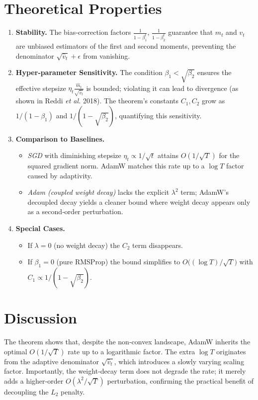 \documentclass{article}
\begin{document}
\section*{Theoretical Properties}
\begin{enumerate}[label=\arabic*.]
\item \textbf{Stability.} The bias‑correction factors $\frac{1}{1-\beta_1^{t}}$, $\frac{1}{1-\beta_2^{t}}$ guarantee that $m_t$ and $v_t$ are unbiased estimators of the first and second moments, preventing the denominator $\sqrt{\hat v_t}+\epsilon$ from vanishing.
\item \textbf{Hyper‑parameter Sensitivity.} The condition $\beta_1<\sqrt{\beta_2}$ ensures the effective stepsize $\eta_t\frac{\hat m_t}{\sqrt{\hat v_t}}$ is bounded; violating it can lead to divergence (as shown in Reddi \emph{et al.} 2018). The theorem’s constants $C_1,C_2$ grow as $1/(1-\beta_1)$ and $1/(1-\sqrt{\beta_2})$, quantifying this sensitivity.
\item \textbf{Comparison to Baselines.}
    \begin{itemize}
        \item \emph{SGD} with diminishing stepsize $\eta_t\propto 1/\sqrt{t}$ attains $O(1/\sqrt{T})$ for the squared gradient norm. AdamW matches this rate up to a $\log T$ factor caused by adaptivity.
        \item \emph{Adam (coupled weight decay)} lacks the explicit $\lambda^2$ term; AdamW’s decoupled decay yields a cleaner bound where weight decay appears only as a second‑order perturbation.
    \end{itemize}
\item \textbf{Special Cases.}
    \begin{itemize}
        \item If $\lambda=0$ (no weight decay) the $C_2$ term disappears.
        \item If $\beta_1=0$ (pure RMSProp) the bound simplifies to $O\bigl((\log T)/\sqrt{T}\bigr)$ with $C_1\propto 1/(1-\sqrt{\beta_2})$.
    \end{itemize}
\end{enumerate}

\section*{Discussion}
The theorem shows that, despite the non‑convex landscape, AdamW inherits the optimal $O(1/\sqrt{T})$ rate up to a logarithmic factor. The extra $\log T$ originates from the adaptive denominator $\sqrt{\hat v_t}$, which introduces a slowly varying scaling factor. Importantly, the weight‑decay term does not degrade the rate; it merely adds a higher‑order $O(\lambda^{2}/\sqrt{T})$ perturbation, confirming the practical benefit of decoupling the $L_2$ penalty.
\end{document}
